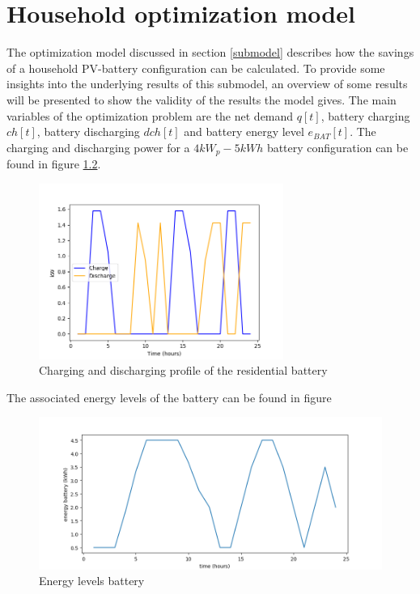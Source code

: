\chapter{Household optimization model}
\label{app:A}
The optimization model discussed in section \ref{submodel} describes how the savings of a household PV-battery configuration can be calculated. To provide some insights into the underlying results of this submodel, an overview of some results will be presented to show the validity of the results the model gives.
\newline \newline \noindent
The main variables of the optimization problem are the net demand $q[t]$, battery charging $ch[t]$, battery discharging $dch[t]$ and battery energy level $e_{BAT}[t]$. The charging and discharging power for a $4kW_p - 5kWh$ battery configuration can be found in figure \ref{figure:charge}.
\newline 
\begin{figure}[h!]
\centering
\includegraphics[width=8cm]{(Dis)charge.png}
\caption{Charging and discharging profile of the residential battery}
\label{figure:charge}
\end{figure}
\newline 
The associated energy levels of the battery can be found in figure 
\newline 
\begin{figure}[h!]
\centering
\includegraphics[width=12cm]{energy.png}
\caption{Energy levels battery}
\label{figure:charge}
\end{figure}
\newline
